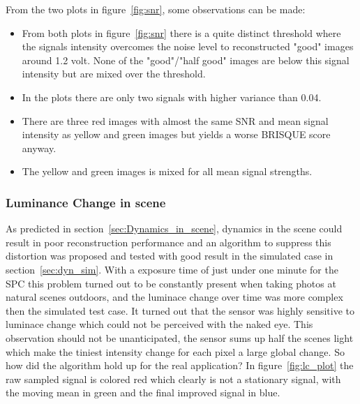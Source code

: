 From the two plots in figure~\ref{fig:snr}, some observations can be made:


\begin{itemize}
\item From both plots in figure~\ref{fig:snr} there is a quite distinct threshold where the signals intensity overcomes the noise level to reconstructed "good" images around 1.2 volt. None of the "good"/"half good" images are below this signal intensity but are mixed over the threshold. 


\item In the plots there are only two signals with higher variance than 0.04.


\item There are three red images with almost the same SNR and mean signal intensity as yellow and green images but yields a worse BRISQUE score anyway.

\item The yellow and green images is mixed for all mean signal strengths.

\end{itemize}



\subsubsection{Luminance Change in scene}
As predicted in section~\ref{sec:Dynamics_in_scene}, dynamics in the scene could result in poor reconstruction performance and an algorithm to suppress this distortion was proposed and tested with good result in the simulated case in section~\ref{sec:dyn_sim}. With a exposure time of just under one minute for the SPC this problem turned out to be constantly present when taking photos at natural scenes outdoors, and the luminace change over time was more complex then the simulated test case. It turned out that the sensor was highly sensitive to luminace change which could not be perceived with the naked eye. This observation should not be unanticipated, the sensor sums up half the scenes light which make the tiniest intensity change for each pixel a large global change. So how did the algorithm hold up for the real application? In figure~\ref{fig:lc_plot} the raw sampled signal is colored red which clearly is not a stationary signal, with the moving mean in green and the final improved signal in blue. 

